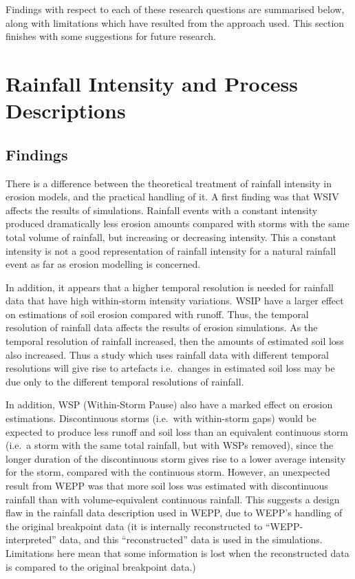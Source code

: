 Findings with respect to each of these research questions are summarised below,
along with limitations which have resulted from the approach used. This section
finishes with some suggestions for future research.

\section{Rainfall Intensity and Process Descriptions}
\label{sec:RainfallIntensityAndProcessDescriptions}
\subsection{Findings}
\label{sec:FindingsStage1}

There is a difference between the theoretical treatment of rainfall
intensity in erosion models, and the practical handling of it.
A first finding was that WSIV affects the results of simulations. Rainfall
events with a constant intensity produced dramatically less erosion amounts
compared with storms with the same total volume of rainfall, but increasing or
decreasing intensity. This a constant intensity is not a good representation of
rainfall intensity for a natural rainfall event as far as erosion modelling is
concerned.

In addition, it appears that a higher temporal resolution is needed for rainfall
data that have high within-storm intensity variations. WSIP have a larger effect
on estimations of soil erosion compared with runoff. Thus, the temporal
resolution of rainfall data affects the results of erosion simulations. As the
temporal resolution of rainfall increased, then the amounts of estimated soil
loss also increased. Thus a study which uses rainfall data with different
temporal resolutions will give rise to artefacts i.e.\ changes in estimated soil
loss may be due only to the different temporal resolutions of rainfall.

In addition, WSP (Within-Storm Pause) also have a marked effect on erosion
estimations. Discontinuous storms (i.e.\ with within-storm gaps) would be
expected to produce less runoff and soil loss than an equivalent continuous
storm (i.e.\ a storm with the same total rainfall, but with WSPs removed), since
the longer duration of the discontinuous storm gives rise to a lower average
intensity for the storm, compared with the continuous storm.
However, an unexpected result from WEPP was that more soil loss was estimated
with discontinuous rainfall than with volume-equivalent continuous rainfall.
This suggests a design flaw in the rainfall data description used in WEPP, due
to WEPP's handling of the  original breakpoint data (it is internally
reconstructed to ``WEPP-interpreted'' data, and this ``reconstructed'' data is
used in the simulations. Limitations here mean that some information is lost
when the reconstructed data is compared to the original breakpoint data.)


